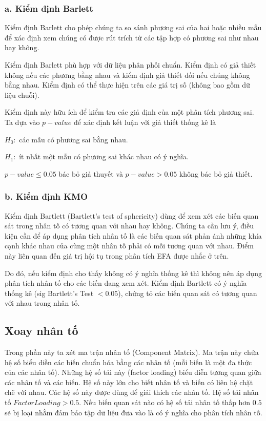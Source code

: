 \documentclass[../thesis.tex]{subfiles}
\begin{document}
\subsubsection{a. Kiểm định Barlett}

Kiểm định Barlett cho phép chúng ta so sánh phương sai của hai hoặc nhiều mẫu để xác định xem chúng có được rút trích từ các tập hợp có phương sai như nhau hay không.

Kiểm định Barlett phù hợp với dữ liệu phân phối chuẩn. Kiểm định có giả thiết không nếu các phương bằng nhau và kiểm định giả thiết đối nếu chúng không bằng nhau.
Kiểm định có thể thực hiện trên các giá trị số (không bao gồm dữ liệu chuỗi).

Kiểm định này hữu ích để kiểm tra các giả định của một phân tích phương sai. Ta dựa vào $ p-value $ để xác định kết luận với giả thiết thống kê là

$ H_0: $ các mẫu có phương sai bằng nhau.

$ H_1: $ ít nhất một mẫu có phương sai khác nhau có ý nghĩa.

$ p-value \leq 0.05 $ bác bỏ giả thuyết và $ p-value > 0.05 $ không bác bỏ giả thiết.

\subsubsection{b. Kiểm định KMO}

Kiểm định Bartlett (Bartlett’s test of sphericity) dùng để xem xét các biến quan sát trong nhân tố có tương quan với nhau hay không. Chúng ta cần lưu ý, điều kiện cần để áp dụng phân tích nhân tố là các biến quan sát phản ánh những khía cạnh khác nhau của cùng một nhân tố phải có mối tương quan với nhau. Điểm này liên quan đến giá trị hội tụ trong phân tích EFA được nhắc ở trên. 

Do đó, nếu kiểm định cho thấy không có ý nghĩa thống kê thì không nên áp dụng phân tích nhân tố cho các biến đang xem xét. Kiểm định Bartlett có ý nghĩa thống kê (sig Bartlett’s Test $ < 0.05 $), chứng tỏ các biến quan sát có tương quan với nhau trong nhân tố.

\subsection{Xoay nhân tố}

Trong phần này ta xét ma trận nhân tố (Component Matrix). Ma trận này chứa hệ số biểu diễn các biến chuẩn hóa bằng các nhân tố (mỗi biến là một đa thức của các nhân tố). Những hệ số tải này (factor loading) biểu diễn tương quan giữa các nhân tố và các biến. Hệ số này lớn cho biết nhân tố và biến có liên hệ chặt chẽ với nhau. Các hệ số này được dùng để giải thích các nhân tố. Hệ số tải nhân tố $ Factor Loading > 0.5 $. Nếu biến quan sát nào có hệ số tải nhân tố thấp hơn $ 0.5 $ sẽ bị loại nhằm đảm bảo tập dữ liệu đưa vào là có ý nghĩa cho phân tích nhân tố. 
\end{document}
